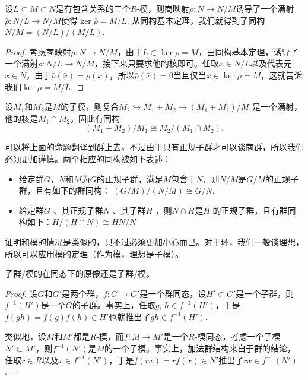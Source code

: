 \begin{pro}
	设$L\subset M \subset N$是有包含关系的三个$R$-模，则商映射$\rho:N\to N/M$诱导了一个满射$\bar{\rho}:N/L \to N/M$使得$\ker \bar{\rho}=M/L$. 从同构基本定理，我们就得到了同构$N/M=(N/L)/(M/L)$.
\end{pro}

\begin{proof}
	考虑商映射$\rho:N\to N/M$，由于$L\subset \ker \rho=M$，由同构基本定理，诱导了一个满射$\bar{\rho}:N/L \to N/M$，接下来只要求他的核即可。任取$\bar{x}\in N/L$以及代表元$x\in N$，由于$\bar{\rho}(\bar{x})=\rho(x)$，所以$\bar{\rho} (\bar{x})=0$当且仅当$x\in \ker \rho =M$，这就告诉我们$\ker \bar{\rho}=M/L$.
\end{proof}

{\pro \label{modiso1}设$M_1$和$M_2$是$M$的子模，则复合$M_2\hookrightarrow M_1+M_2 \to (M_1+M_2)/M_1$是一个满射，他的核是$M_1\cap M_2$，因此有同构
\[
	(M_1+M_2)/M_1\cong M_2/(M_1\cap M_2).
\]
\endpro}

\para 可以将上面的命题翻译到群上去。不过由于只有正规子群才可以谈商群，所以我们必须更加谨慎。两个相应的同构被如下表述：

\begin{itemize}
\item 给定群$G$，$N$和$M$为$G$的正规子群，满足$M$包含于$N$，则$N/M$是$G/M$的正规子群，且有如下的群同构： $ (G/M)/(N/M)\cong G/N$.

\item 给定群$G$ 、其正规子群$N$ 、其子群$H$ ，则$N\cap H$是$H$ 的正规子群，且有群同构如下：$H/(H\cap N)\cong HN/N$
\end{itemize}

证明和模的情况是类似的，只不过必须更加小心而已。对于环，我们一般谈理想，所以可以应用模的定理（作为模，理想是子模）。

\begin{pro}
	子群/模的在同态下的原像还是子群/模。
\end{pro}

\begin{proof}
设$G$和$G'$是两个群，$f:G\to G'$是一个群同态，设$H'\subset G'$是一个子群，则$f^{-1}(H')$是一个$G$的子群。事实上，任取$g$, $h\in f^{-1}(H')$，于是$f(gh)=f(g)f(h)\in H'$也就推出了$gh\in f^{-1}(H')$. 

类似地，设$M$和$M'$都是$R$-模，而$f:M\to M'$是一个$R$-模同态，考虑一个子模$N'\subset M'$，则$f^{-1}(N')$是$M$的一个子模。事实上，加法群结构来自于群的结论，任取$r\in R$以及$x\in f^{-1}(N')$，于是$f(rx)=rf(x)\in N'$推出了$rx\in f^{-1}(N')$. 
\end{proof}


